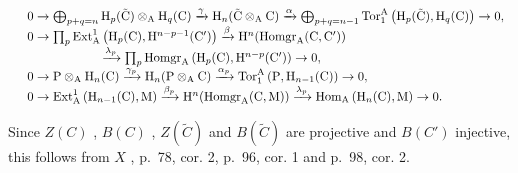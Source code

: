 \[
\begin{array}{r l} & 0 \to \bigoplus_ {p + q = n} \mathrm{H} _ {p} (\tilde {\mathrm{C}}) \otimes_ {\mathrm{A}} \mathrm{H} _ {q} (\mathrm{C}) \xrightarrow {\gamma} \mathrm{H} _ {n} (\tilde {\mathrm{C}} \otimes_ {\mathrm{A}} \mathrm{C}) \xrightarrow {\alpha} \bigoplus_ {p + q = n - 1} \mathrm{Tor} _ {1} ^ {\mathrm{A}} \left(\mathrm{H} _ {p} (\tilde {\mathrm{C}}), \mathrm{H} _ {q} (\mathrm{C})\right) \to 0, \\ & 0 \to \prod_ {p} \mathrm{Ext} _ {\mathrm{A}} ^ {1} \left(\mathrm{H} _ {p} (\mathrm{C}), \mathrm{H} ^ {n - p - 1} (\mathrm{C} ^ {\prime})\right) \xrightarrow {\beta} \mathrm{H} ^ {n} (\mathrm{Homgr} _ {\mathrm{A}} (\mathrm{C}, \mathrm{C} ^ {\prime})) \\ & \qquad \qquad \qquad \xrightarrow {\lambda_ {p}} \prod_ {p} \mathrm{Homgr} _ {\mathrm{A}} \left(\mathrm{H} _ {p} (\mathrm{C}), \mathrm{H} ^ {n - p} (\mathrm{C} ^ {\prime})\right) \to 0, \\ & 0 \to \mathrm{P} \otimes_ {\mathrm{A}} \mathrm{H} _ {n} (\mathrm{C}) \xrightarrow {\gamma_ {p}} \mathrm{H} _ {n} (\mathrm{P} \otimes_ {\mathrm{A}} \mathrm{C}) \xrightarrow {\alpha_ {p}} \mathrm{Tor} _ {1} ^ {\mathrm{A}} \left(\mathrm{P}, \mathrm{H} _ {n - 1} (\mathrm{C})\right) \to 0, \\ & 0 \to \mathrm{Ext} _ {\mathrm{A}} ^ {1} \left(\mathrm{H} _ {n - 1} (\mathrm{C}), \mathrm{M}\right) \xrightarrow {\beta_ {p}} \mathrm{H} ^ {n} (\mathrm{Homgr} _ {\mathrm{A}} (\mathrm{C}, \mathrm{M})) \xrightarrow {\lambda_ {p}} \mathrm{Hom} _ {\mathrm{A}} \left(\mathrm{H} _ {n} (\mathrm{C}), \mathrm{M}\right) \to 0. \end{array}
\]

Since \(Z(C)\) , \(B(C)\) , \(Z(\tilde{C})\) and \(B(\tilde{C})\) are projective and \(B(C')\) injective, this follows from \(X\) , p.~78, cor. 2, p.~96, cor. 1 and p.~98, cor. 2.

